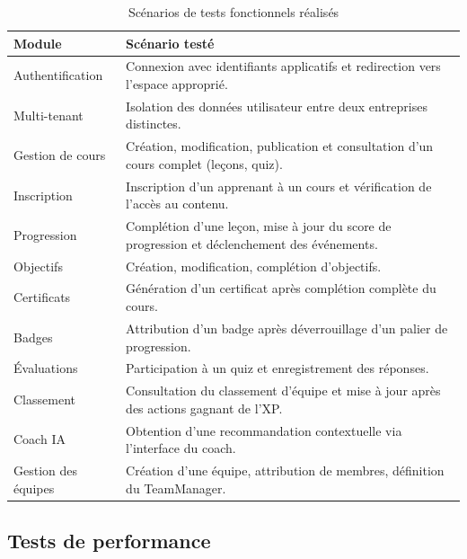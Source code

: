 \begin{table}[H]
    \centering
    \caption{Scénarios de tests fonctionnels réalisés}
    \label{tab:ch3_func_tests_scope}
    \begin{tabularx}{\textwidth}{|p{4cm}|X|}
        \hline
        \textbf{Module} & \textbf{Scénario testé} \\
        \hline
        Authentification & Connexion avec identifiants applicatifs et redirection vers l'espace approprié. \\
        \hline
        Multi-tenant & Isolation des données utilisateur entre deux entreprises distinctes. \\
        \hline
        Gestion de cours & Création, modification, publication et consultation d'un cours complet (leçons, quiz). \\
        \hline
        Inscription & Inscription d'un apprenant à un cours et vérification de l'accès au contenu. \\
        \hline
        Progression & Complétion d'une leçon, mise à jour du score de progression et déclenchement des événements. \\
        \hline
        Objectifs & Création, modification, complétion d'objectifs. \\
        \hline
        Certificats & Génération d'un certificat après complétion complète du cours. \\
        \hline
        Badges & Attribution d'un badge après déverrouillage d'un palier de progression. \\
        \hline
        Évaluations & Participation à un quiz et enregistrement des réponses. \\
        \hline
        Classement & Consultation du classement d'équipe et mise à jour après des actions gagnant de l'XP. \\
        \hline
        Coach IA & Obtention d'une recommandation contextuelle via l'interface du coach. \\
        \hline
        Gestion des équipes & Création d'une équipe, attribution de membres, définition du TeamManager. \\
        \hline
    \end{tabularx}
\end{table}

\subsection{Tests de performance}

